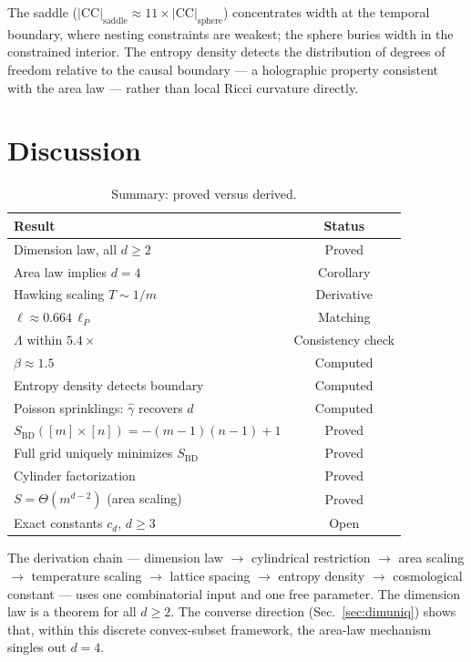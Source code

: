 \documentclass[aps,prl,twocolumn,superscriptaddress]{revtex4-2}
\begin{document}
The saddle ($|\mathrm{CC}|_{\mathrm{saddle}} \approx 11 \times
|\mathrm{CC}|_{\mathrm{sphere}}$) concentrates width at the temporal
boundary, where nesting constraints are weakest; the sphere buries
width in the constrained interior. The entropy density detects the
distribution of degrees of freedom relative to the causal boundary ---
a holographic property consistent with the area law --- rather than
local Ricci curvature directly.

\section{Discussion}

\begin{table}[h]
\caption{Summary: proved versus derived.}
\label{tab:status}
\begin{ruledtabular}
\begin{tabular}{lc}
Result & Status \\
\midrule
Dimension law, all $d \geq 2$ & Proved \\
Area law implies $d=4$ & Corollary \\
Hawking scaling $T \sim 1/m$ & Derivative \\
$\ell \approx 0.664\,\ell_P$ & Matching \\
$\Lambda$ within $5.4\times$ & Consistency check \\
$\beta \approx 1.5$ & Computed \\
Entropy density detects boundary & Computed \\
Poisson sprinklings: $\hat{\gamma}$ recovers $d$ & Computed \\
$S_{\mathrm{BD}}([m]{\times}[n]) = -(m{-}1)(n{-}1){+}1$ & Proved \\
Full grid uniquely minimizes $S_{\mathrm{BD}}$ & Proved \\
Cylinder factorization & Proved \\
$S = \Theta(m^{d-2})$ (area scaling) & Proved \\
Exact constants $c_d$, $d \geq 3$ & Open \\
\end{tabular}
\end{ruledtabular}
\end{table}

The derivation chain --- dimension law $\to$ cylindrical restriction
$\to$ area scaling $\to$ temperature scaling $\to$ lattice spacing $\to$ entropy
density $\to$ cosmological constant --- uses one combinatorial input
and one free parameter. The dimension law is a theorem
for all $d \geq 2$. The converse direction (Sec.~\ref{sec:dimuniq})
shows that, within this discrete convex-subset framework, the area-law
mechanism singles out $d = 4$.
\end{document}
